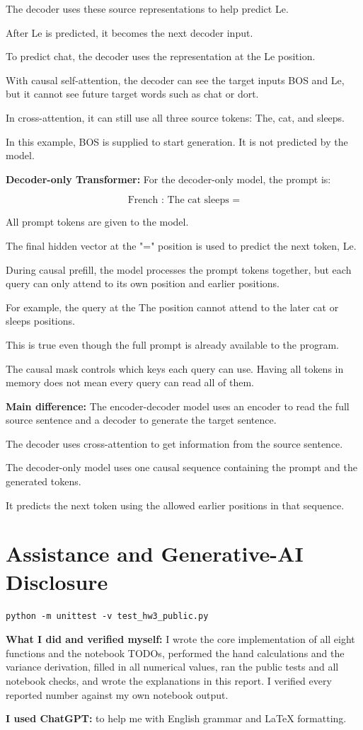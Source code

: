 \documentclass[11pt]{article}
\begin{document}
The decoder uses these source representations
to help predict Le.

After Le is predicted, it becomes the next
decoder input.

To predict chat, the decoder uses the
representation at the Le position.

With causal self-attention, the decoder can
see the target inputs BOS and Le, but it
cannot see future target words such as
chat or dort.

In cross-attention, it can still use all
three source tokens: The, cat, and sleeps.

In this example, BOS is supplied to start
generation. It is not predicted by the model.

\textbf{Decoder-only Transformer:} For the decoder-only model, the prompt is:

\[
\text{French : The cat sleeps =}
\]

All prompt tokens are given to the model.

The final hidden vector at the "=" position
is used to predict the next token, Le.

During causal prefill, the model processes
the prompt tokens together, but each query
can only attend to its own position and
earlier positions.

For example, the query at the The position
cannot attend to the later cat or sleeps
positions.

This is true even though the full prompt
is already available to the program.

The causal mask controls which keys each
query can use. Having all tokens in memory
does not mean every query can read all of them.

\textbf{Main difference:} The encoder-decoder model uses an encoder to read the full source sentence and a decoder to generate the target sentence.

The decoder uses cross-attention to get
information from the source sentence.

The decoder-only model uses one causal
sequence containing the prompt and the
generated tokens.

It predicts the next token using the
allowed earlier positions in that sequence.
\section*{Assistance and Generative-AI Disclosure}
\begin{verbatim}
python -m unittest -v test_hw3_public.py
\end{verbatim}

\textbf{What I did and verified myself:} I wrote the core implementation
of all eight functions and the notebook TODOs, performed the hand
calculations and the variance derivation, filled in all numerical values,
ran the public tests and all notebook checks, and wrote the explanations
in this report. I verified every reported number against my own notebook
output.


\textbf{I used ChatGPT:} to help me with English grammar and LaTeX formatting.
\end{document}
